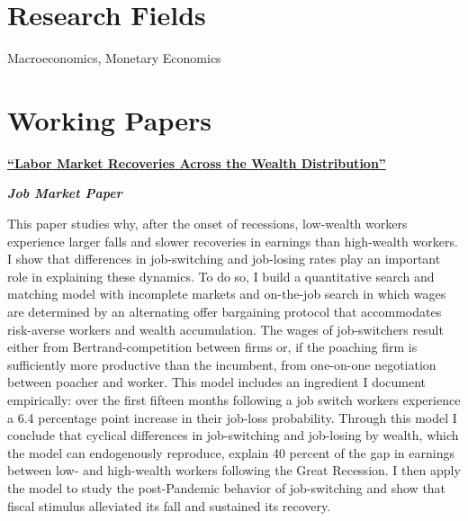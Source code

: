 \documentclass[margin,line]{res}                          %
\newenvironment{list1}{
	\begin{list}{\ding{113}}{%
			\setlength{\itemsep}{0in}
			\setlength{\parsep}{0in} \setlength{\parskip}{0in}
			\setlength{\topsep}{0in} \setlength{\partopsep}{0in}
			\setlength{\leftmargin}{0.17in}}}{\end{list}}
\begin{document}
\begin{resume}
		\section{\sc Research Fields}%
	\begin{list1}
		\item[] Macroeconomics, Monetary Economics
	\end{list1}
	
	\section{\sc Working Papers}
	\begin{list1}
		\item[] \href{https://danicaratelli.github.io/research/papers/JMP_Caratelli.pdf}{\textbf{{\color{darkblue}``Labor Market Recoveries Across the Wealth Distribution''}}}\smallskip
		\item[] \emph{\textbf{Job Market Paper}}\smallskip
		\item[] This paper studies why, after the onset of recessions, low-wealth workers experience larger falls and slower recoveries in earnings than high-wealth workers. I show that differences in job-switching and job-losing rates play an important role in explaining these dynamics. To do so, I build a quantitative search and matching model with incomplete markets and on-the-job search in which wages are determined by an alternating offer bargaining protocol that accommodates risk-averse workers and wealth accumulation. The wages of job-switchers result either from Bertrand-competition between firms or, if the poaching firm is sufficiently more productive than the incumbent, from one-on-one negotiation between poacher and worker. This model includes an ingredient I document empirically: over the first fifteen months following a job switch workers experience a 6.4 percentage point increase in their job-loss probability. Through this model I conclude that cyclical differences in job-switching and job-losing by wealth, which the model can endogenously reproduce, explain 40 percent of the gap in earnings between low- and high-wealth workers following the Great Recession. I then apply the model to study the post-Pandemic behavior of job-switching and show that fiscal stimulus alleviated its fall and sustained its recovery.
		
		\vspace{7pt}
		

\end{list1}
\end{resume}
\end{document}
